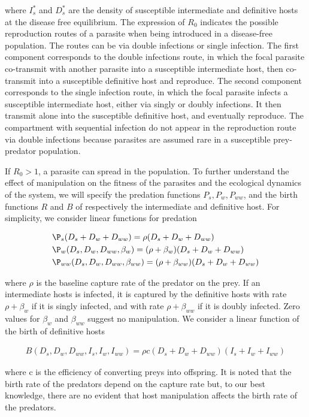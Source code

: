 \documentclass[11pt]{article}
\begin{document}
where $I_s^*$ and $D_s^*$ are the density of susceptible intermediate and definitive hosts at the disease free equilibrium. The expression of $R_0$ indicates the possible reproduction routes of a parasite when being introduced in a disease-free population. The routes can be via double infections or single infection. The first component corresponds to the double infections route, in which the focal parasite co-transmit with another parasite into a susceptible intermediate host, then co-transmit into a susceptible definitive host and reproduce. The second component corresponds to the single infection route, in which the focal parasite infects a susceptible intermediate host, either via singly or doubly infections. It then transmit alone into the susceptible definitive host, and eventually reproduce. The compartment with sequential infection do not appear in the reproduction route via double infections because parasites are assumed rare in a susceptible prey-predator population.


If $R_0 > 1$, a parasite can spread in the population. To further understand the effect of manipulation on the fitness of the parasites and the ecological dynamics of the system, we will specify the predation functions $P_s, P_w, P_{ww}$, and the birth functions $R$ and $B$ of respectively the intermediate and definitive host. For simplicity, we consider linear functions for predation 

\begin{align*}
& \P_s(D_s + D_w + D_{ww}) = \rho (D_s + D_w + D_{ww}) \\
& \P_w(D_s, D_w, D_{ww}, \beta_w) = (\rho + \beta_w) (D_s + D_w + D_{ww}) \\
& \P_{ww}(D_s, D_w, D_{ww}, \beta_{ww}) =  (\rho + \beta_{ww}) (D_s + D_w + D_{ww})
\end{align*}

where $\rho$ is the baseline capture rate of the predator on the prey. If an intermediate hosts is infected, it is captured by the definitive hosts with rate $\rho + \beta_w$ if it is singly infected, and with rate $\rho + \beta_{ww}$ if it is doubly infected. Zero values for $\beta_w$ and $\beta_{ww}$ suggest no manipulation. We consider a linear function of the birth of definitive hosts

\begin{align*}
B(D_s, D_w, D_{ww}, I_s, I_w, I_{ww}) = \rho c (D_s + D_w + D_{ww}) (I_s + I_w + I_{ww})
\end{align*}

where c is the efficiency of converting preys into offspring. It is noted that the birth rate of the predators depend on the capture rate but, to our best knowledge, there are no evident that host manipulation affects the birth rate of the predators.
\end{document}
